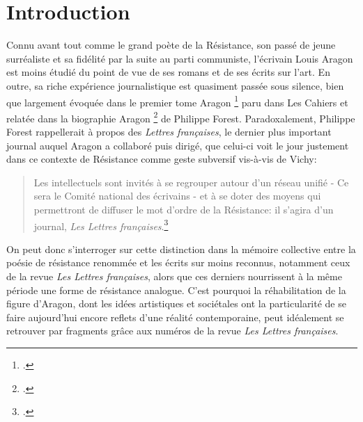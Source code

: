 \chapter*{Introduction}
Connu avant tout comme le grand poète de la Résistance, son passé de jeune surréaliste et sa fidélité par la suite au parti communiste, l'écrivain Louis Aragon est moins étudié du point de vue de ses romans et de ses écrits sur l'art. En outre, sa riche expérience journalistique est quasiment passée sous silence, bien que largement évoquée dans le premier tome Aragon \footcite[]{cahiers} paru dans Les Cahiers et relatée dans la biographie Aragon \footcite[]{biographie}  de Philippe Forest. Paradoxalement, Philippe Forest rappellerait à propos des \emph{Lettres françaises}, le dernier plus important journal auquel Aragon a collaboré puis dirigé, que celui-ci voit le jour justement dans ce contexte de Résistance comme geste subversif vis-à-vis de Vichy:
\begin{quote} 
Les intellectuels sont invités à se regrouper autour d'un réseau unifié - Ce sera le Comité national des écrivains - et à se doter des moyens qui permettront de diffuser le mot d'ordre de la Résistance: il s'agira d'un journal, \emph{Les Lettres françaises}.\footcite[]{biographie}
\end{quote}
On peut donc s'interroger sur cette distinction dans la mémoire collective entre la poésie de résistance renommée et les écrits sur  moins reconnus, notamment ceux de la revue \emph{Les Lettres françaises}, alors que ces derniers nourrissent à la même période une forme de résistance analogue. C'est pourquoi la réhabilitation de la figure d'Aragon, dont les idées artistiques et sociétales ont la particularité de se faire aujourd'hui encore reflets d'une réalité contemporaine, peut idéalement se retrouver par fragments grâce aux numéros de la revue \emph{Les Lettres françaises}.



